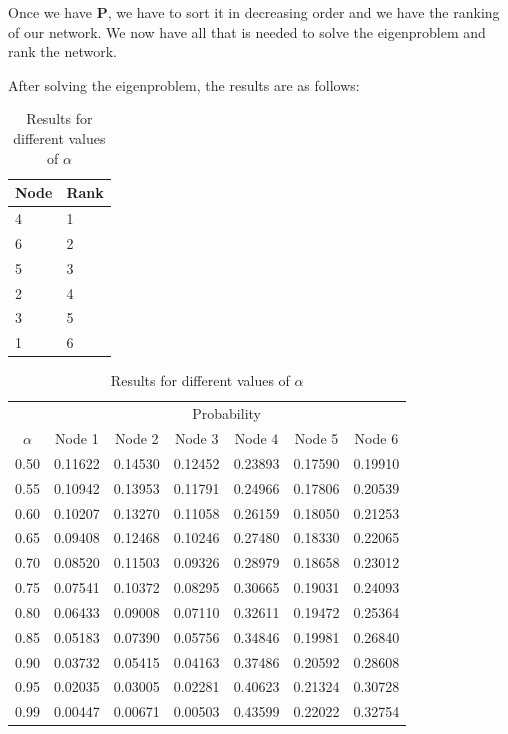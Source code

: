 Once we have \textbf{P}, we have to sort it in decreasing order and we have the ranking of our network. We now have all that is needed to solve the eigenproblem and rank the network.


After solving the eigenproblem, the results are as follows:

\begin{table}[htbp]
    \begin{minipage}{.25\linewidth}
        \centering
        \begin{tabular}{ll}
            \toprule
            Node & Rank\\
            \midrule
            4 & 1\\
            6 & 2\\
            5 & 3\\
            2 & 4\\
            3 & 5\\
            1 & 6\\
            \bottomrule
        \end{tabular}
        \caption{Ranking for \autoref{fig:network}}\label{tab:node}
    \end{minipage}
    \hfill
    \begin{minipage}{.65\linewidth}
        \centering
        \begin{tabular}{ccccccc}
            \toprule
            & \multicolumn{6}{c}{Probability}\\
            \cmidrule{2-7}
            $\alpha$ & Node 1 & Node 2 & Node 3 & Node 4 & Node 5 & Node 6\\
            \midrule
            0.50 & 0.11622 & 0.14530 & 0.12452 & 0.23893 & 0.17590 & 0.19910\\
            0.55 & 0.10942 & 0.13953 & 0.11791 & 0.24966 & 0.17806 & 0.20539\\
            0.60 & 0.10207 & 0.13270 & 0.11058 & 0.26159 & 0.18050 & 0.21253\\
            0.65 & 0.09408 & 0.12468 & 0.10246 & 0.27480 & 0.18330 & 0.22065\\
            0.70 & 0.08520 & 0.11503 & 0.09326 & 0.28979 & 0.18658 & 0.23012\\
            0.75 & 0.07541 & 0.10372 & 0.08295 & 0.30665 & 0.19031 & 0.24093\\
            0.80 & 0.06433 & 0.09008 & 0.07110 & 0.32611 & 0.19472 & 0.25364\\
            0.85 & 0.05183 & 0.07390 & 0.05756 & 0.34846 & 0.19981 & 0.26840\\
            0.90 & 0.03732 & 0.05415 & 0.04163 & 0.37486 & 0.20592 & 0.28608\\
            0.95 & 0.02035 & 0.03005 & 0.02281 & 0.40623 & 0.21324 & 0.30728\\
            0.99 & 0.00447 & 0.00671 & 0.00503 & 0.43599 & 0.22022 & 0.32754\\
            \bottomrule
        \end{tabular}
        \caption{Results for different values of $\alpha$}\label{tab:alpha}
    \end{minipage}
\end{table}

